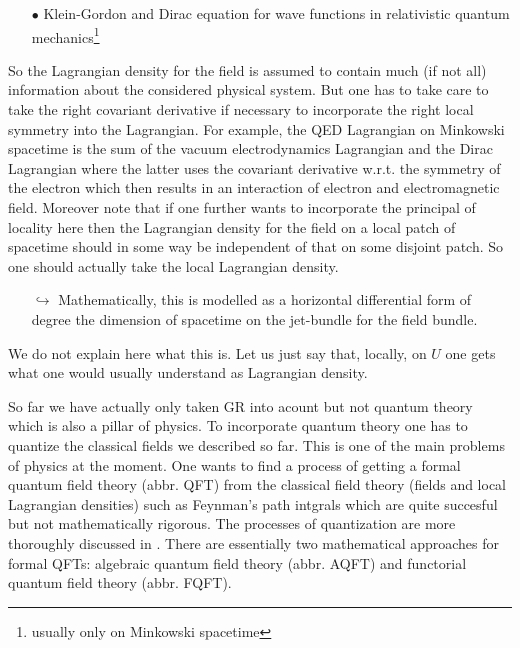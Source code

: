 \begin{enumerate}
\begin{enumerate}
\item[$\bullet$]
Klein-Gordon and Dirac equation for wave functions in relativistic quantum mechanics\footnote{usually only on Minkowski spacetime}
\end{enumerate}
So the Lagrangian density for the field is assumed to contain much (if not all) information about the considered physical system. But one has to take care to take the right covariant derivative if necessary to incorporate the right local symmetry into the Lagrangian. For example, the QED Lagrangian on Minkowski spacetime is the sum of the vacuum electrodynamics Lagrangian and the Dirac Lagrangian where the latter uses the covariant derivative w.r.t. the symmetry of the electron which then results in an interaction of electron and electromagnetic field. Moreover note that if one further wants to incorporate the principal of locality here then the Lagrangian density for the field on a local patch of spacetime should in some way be independent of that on some disjoint patch. So one should actually take the local Lagrangian density.
\begin{enumerate}
\item[$\pmb{\hookrightarrow}$]
Mathematically, this is modelled as a horizontal differential form of degree the dimension of spacetime on the jet-bundle for the field bundle.
\end{enumerate}
We do not explain here what this is. Let us just say that, locally, on $U$ one gets what one would usually understand as Lagrangian density.
\end{enumerate}
So far we have actually only taken GR into acount but not quantum theory which is also a pillar of physics. To incorporate quantum theory one has to quantize the classical fields we described so far. This is one of the main problems of physics at the moment. One wants to find a process of getting a formal quantum field theory (abbr. QFT) from the classical field theory (fields and local Lagrangian densities) such as Feynman's path intgrals which are quite succesful but not mathematically rigorous. The processes of quantization are more thoroughly discussed in \cite{00000011}. There are essentially two mathematical approaches for formal QFTs: algebraic quantum field theory (abbr. AQFT) and functorial quantum field theory (abbr. FQFT).
